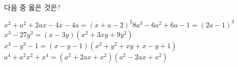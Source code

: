 다음 중 옳은 것은?
\begin{choicesv}{$x^2+a^2+2ax-4x-4a=(x+a-2)^2$}{$8a^3-6a^2+6a-1=(2a-1)^3$}{$x^3-27y^3=(x-3y)(x^2+3xy+9y^2)$}{$x^3-y^3-1=(x-y-1)(x^2+y^2+xy+x-y+1)$}{$a^4+a^2x^2+x^4=(a^2+2ax+x^2)(a^2-2ax+x^2)$}\end{choicesv}
